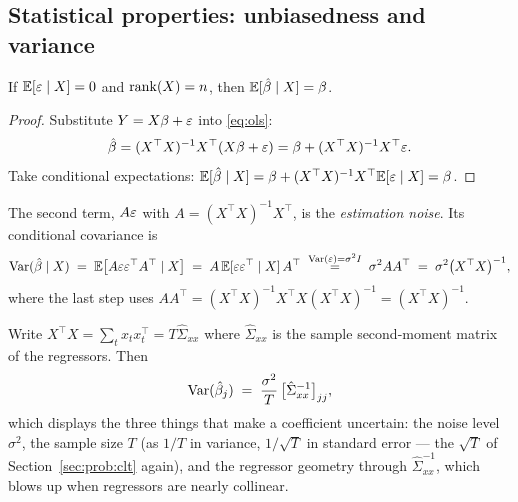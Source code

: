 \subsection{Statistical properties: unbiasedness and variance}
\label{sec:ols:properties}

\begin{theorem}[Unbiasedness]
If $\mathbb{E}[\varepsilon\mid X]=0$ and $\operatorname{rank}(X)=n$, then $\mathbb{E}[\hat\beta\mid X]=\beta$.
\end{theorem}
\begin{proof}
Substitute $Y=X\beta+\varepsilon$ into \eqref{eq:ols}:
\[
  \hat\beta = (X^{\top}X)^{-1}X^{\top}(X\beta+\varepsilon)
  = \beta + (X^{\top}X)^{-1}X^{\top}\varepsilon .
\]
Take conditional expectations: $\mathbb{E}[\hat\beta\mid X]=\beta+(X^{\top}X)^{-1}X^{\top}\mathbb{E}[\varepsilon\mid X]=\beta$.
\end{proof}

The second term, $A\varepsilon$ with $A=(X^{\top}X)^{-1}X^{\top}$, is the \emph{estimation
noise}. Its conditional covariance is
\begin{equation}
  \operatorname{Var}(\hat\beta\mid X) \;=\; \mathbb{E}\bigl[A\varepsilon\varepsilon^{\top}A^{\top}\mid X\bigr]
  \;=\; A\,\mathbb{E}[\varepsilon\varepsilon^{\top}\mid X]\,A^{\top}
  \;\overset{\operatorname{Var}(\varepsilon)=\sigma^2 I}{=}\; \sigma^{2}AA^{\top}
  \;=\; \sigma^{2}\bigl(X^{\top}X\bigr)^{-1},
  \label{eq:ols:varbeta}
\end{equation}
where the last step uses $AA^{\top}=(X^{\top}X)^{-1}X^{\top}X(X^{\top}X)^{-1}=(X^{\top}X)^{-1}$.

Write $X^{\top}X = \sum_{t} x_tx_t^{\top} = T\hat\Sigma_{xx}$ where $\hat\Sigma_{xx}$
is the sample second-moment matrix of the regressors. Then
\begin{equation}
  \operatorname{Var}(\hat\beta_j) \;=\; \frac{\sigma^{2}}{T}\,\bigl[\hat\Sigma_{xx}^{-1}\bigr]_{jj},
  \label{eq:ols:varscale}
\end{equation}
which displays the three things that make a coefficient uncertain: the noise level
$\sigma^2$, the sample size $T$ (as $1/T$ in variance, $1/\sqrt T$ in standard error ---
the $\sqrt T$ of Section~\ref{sec:prob:clt} again), and the regressor geometry through
$\hat\Sigma_{xx}^{-1}$, which blows up when regressors are nearly collinear.


